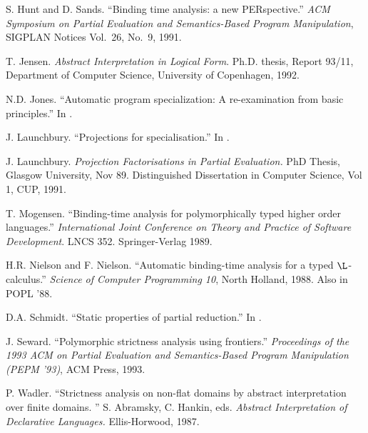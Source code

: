 \documentclass[11pt]{article}
\begin{document}
\begin{thebibliography}{123456}
S. Hunt and D. Sands.
``Binding time analysis:  a new PERspective.''
{\it ACM Symposium on Partial Evaluation
and Semantics-Based Program Manipulation},
SIGPLAN Notices Vol.\ 26, No.\ 9, 1991.

T. Jensen.
{\it Abstract Interpretation in Logical Form}.
Ph.D. thesis, Report 93/11, Department of Computer Science,
University of Copenhagen, 1992.

N.D. Jones.
``Automatic program specialization: A re-examination from
basic principles.'' In \cite{BEJ88}.

J. Launchbury.
``Projections for specialisation.''
In \cite{BEJ88}.

J. Launchbury. 
{\it Projection Factorisations in Partial Evaluation.} PhD
Thesis, Glasgow University, Nov 89. Distinguished Dissertation in
Computer Science, Vol 1, CUP, 1991.

T. Mogensen.
``Binding-time analysis for polymorphically typed higher order languages.''
{\it International Joint Conference on Theory and Practice of Software
Development}. LNCS 352. Springer-Verlag 1989.

H.R. Nielson and F. Nielson.
``Automatic binding-time analysis for a typed $\L$-calculus.''
{\it Science of Computer Programming 10},
North Holland, 1988.  Also in POPL '88.

D.A. Schmidt.
``Static properties of partial reduction.''
In \cite{BEJ88}.

J. Seward.
``Polymorphic strictness analysis using frontiers.''
{\it Proceedings of the 1993 ACM on Partial Evaluation and
Semantics-Based Program Manipulation (PEPM '93)},
ACM Press, 1993.

P. Wadler.
``Strictness analysis on non-flat domains by abstract interpretation over finite domains. '' 
S. Abramsky, C. Hankin, eds.
{\it Abstract Interpretation of Declarative Languages.}
Ellis-Horwood, 1987.


\end{thebibliography}
\end{document}
